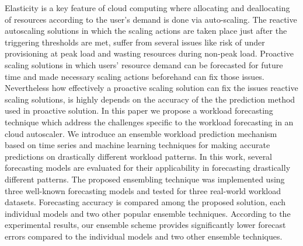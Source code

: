Elasticity is a key feature of cloud computing where allocating and deallocating of resources according to the user’s demand is done via auto-scaling. The reactive autoscaling solutions in which the scaling actions are taken place just after the triggering thresholds are met, suffer from several issues like risk of under provisioning at peak load and wasting resources during non-peak load. Proactive scaling solutions in which users’ resource demand can be forecasted for future time and made necessary scaling actions beforehand can fix those issues. Nevertheless how effectively a proactive scaling solution can fix the issues reactive scaling solutions, is highly depends on the accuracy of the the prediction method used in proactive solution. In this paper we propose a workload forecasting technique which address the challenges specific to the workload forecasting in an cloud autoscaler. We introduce an ensemble workload prediction mechanism based on time series and machine learning techniques for making accurate predictions on drastically different workload patterns.  In this work, several forecasting models are evaluated for their applicability in forecasting drastically different patterns. The proposed ensembling technique was implemented using three well-known forecasting models and tested for three real-world workload datasets. Forecasting accuracy is compared among  the proposed solution, each individual models and two other popular ensemble techniques.  According to the experimental results, our ensemble scheme provides significantly lower forecast errors compared to the individual models and two other ensemble techniques.